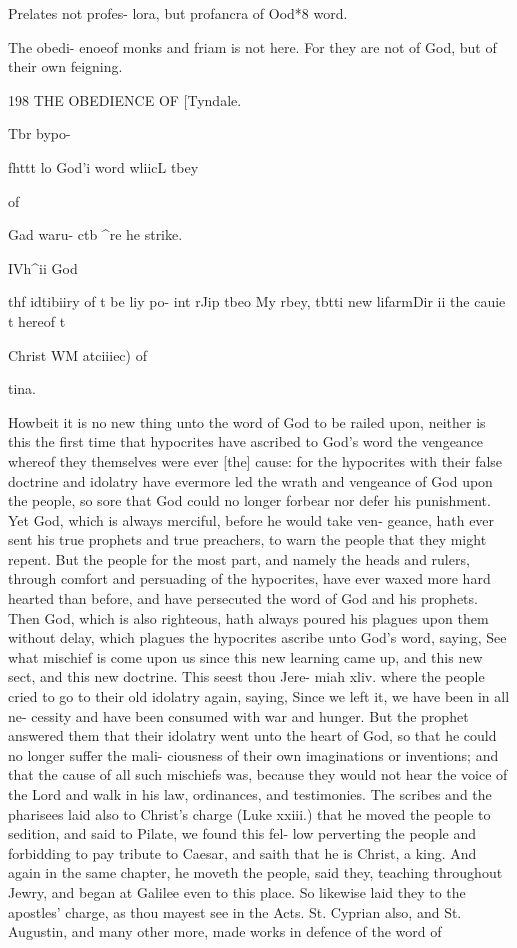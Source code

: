 \documentclass{custom}
\begin{document}
Prelates 
not profes- 
lora, but 
profancra 
of Ood*8 
word. 

The obedi- 
enoeof 
monks and 
friam is 
not here. 
For they 
are not of 
God, but of 
their own 
feigning. 


198
THE OBEDIENCE OF 
[Tyndale.

Tbr bypo- 

fhttt lo 
God'i word 
wliicL tbey 

of 

Gad waru- 
ctb ^re he 
strike. 

IVh^ii God 

thf idtibiiry 
of t be liy po- 
int rJip tbeo 
My rbey, 
tbtti new 
lifarmDir ii 
the cauie 
t hereof t 

Christ WM 
atciiiec) of 

tina. 

Howbeit it is no new thing unto the word of God to be 
railed upon, neither is this the first time that hypocrites
have ascribed to God's word the vengeance whereof they 
themselves were ever [the] cause: for the hypocrites with
their false doctrine and idolatry have evermore led the wrath
and vengeance of God upon the people, so sore that God
could no longer forbear nor defer his punishment. Yet 
God, which is always merciful, before he would take ven- 
geance, hath ever sent his true prophets and true preachers, 
to warn the people that they might repent. But the people
for the most part, and namely the heads and rulers, through 
comfort and persuading of the hypocrites, have ever waxed 
more hard hearted than before, and have persecuted the 
word of God and his prophets. Then God, which is 
also righteous, hath always poured his plagues upon
them without delay, which plagues the hypocrites 
ascribe unto God's word, saying, See what mischief 
is come upon us since this new learning came up, and this 
new sect, and this new doctrine. This seest thou Jere- 
miah xliv. where the people cried to go to their old idolatry
again, saying, Since we left it, we have been in all ne-
cessity and have been consumed with war and hunger. But 
the prophet answered them that their idolatry went unto the 
heart of God, so that he could no longer suffer the mali- 
ciousness of their own imaginations or inventions; and that 
the cause of all such mischiefs was, because they would not 
hear the voice of the Lord and walk in his law, ordinances, 
and testimonies. The scribes and the pharisees laid also 
to Christ's charge (Luke xxiii.) that he moved the 
people to sedition, and said to Pilate, we found this fel- 
low perverting the people and forbidding to pay tribute to 
Caesar, and saith that he is Christ, a king. And again in the
same chapter, he moveth the people, said they, teaching 
throughout Jewry, and began at Galilee even to this place. 
So likewise laid they to the apostles' charge, as thou mayest 
see in the Acts. St. Cyprian also, and St. Augustin, and 
many other more, made works in defence of the word of 
\end{document}
